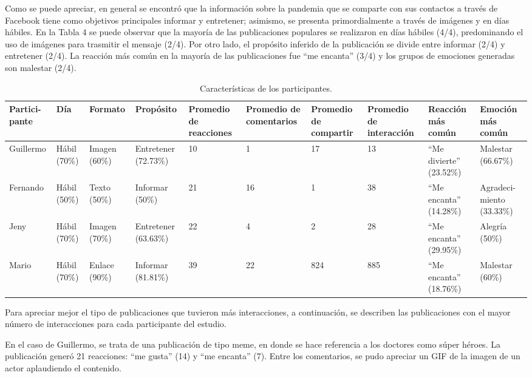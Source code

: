 \documentclass{textolivre}
\begin{document}
Como se puede apreciar, en general se encontró que la información sobre la pandemia que se comparte con sus contactos a través de Facebook tiene como objetivos principales informar y entretener; asimismo, se presenta primordialmente a través de imágenes y en días hábiles. En la Tabla 4 se puede observar que la mayoría de las publicaciones populares se realizaron en días hábiles (4/4), predominando el uso de imágenes para trasmitir el mensaje (2/4). Por otro lado, el propósito inferido de la publicación se divide entre informar (2/4) y entretener (2/4). La reacción más común en la mayoría de las publicaciones fue “me encanta” (3/4) y los grupos de emociones generadas son malestar (2/4). 

%
%
\begin{table}[htpb]
\caption{Características de los participantes.}
\label{tab04}
\small
\centering
\begin{tabularx}{\textwidth}{XXXXXXXXXX}
\toprule 
Partici-pante & Día & Formato & Propósito & Promedio de reacciones &
Promedio de comentarios & Promedio de compartir & Promedio de interacción &
Reacción más común & Emoción más común \\
\midrule
Guillermo & Hábil (70\%) & Imagen (60\%) & Entretener (72.73\%) & 10 & 1 & 17 & 13 & “Me divierte” (23.52\%) & Malestar (66.67\%) \\
Fernando & Hábil (50\%) & Texto (50\%) & Informar (50\%) & 21 & 16 & 1 & 38 & “Me encanta” (14.28\%) & Agradeci-miento (33.33\%) \\
Jeny & Hábil (70\%) & Imagen (70\%) & Entretener (63.63\%) & 22 & 4 & 2 & 28 & “Me encanta” (29.95\%) & Alegría (50\%) \\
Mario & Hábil (70\%) & Enlace (90\%) & Informar (81.81\%) & 39 & 22 & 824 & 885 & “Me encanta” (18.76\%) & Malestar (60\%) \\
\bottomrule
\end{tabularx}
\end{table}

Para apreciar mejor el tipo de publicaciones que tuvieron más interacciones, a continuación, se describen las publicaciones con el mayor número de interacciones para cada participante del estudio. 

En el caso de Guillermo, se trata de una publicación de tipo meme, en donde se hace referencia a los doctores como súper héroes. La publicación generó 21 reacciones: “me gusta” (14) y “me encanta” (7). Entre los comentarios, se pudo apreciar un GIF de la imagen de un actor aplaudiendo el contenido. 
\end{document}

